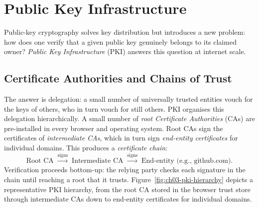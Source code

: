 \section{Public Key Infrastructure}
\label{sec:pki}

Public-key cryptography solves key distribution but introduces a new problem: how does one verify that a given public key genuinely belongs to its claimed owner?  \emph{Public Key Infrastructure} (PKI) answers this question at internet scale.

\subsection{Certificate Authorities and Chains of Trust}
\label{subsec:ca}

The answer is delegation: a small number of universally trusted entities vouch for the keys of others, who in turn vouch for still others.  PKI organises this delegation hierarchically.  A small number of \emph{root Certificate Authorities} (CAs) are pre-installed in every browser and operating system.  Root CAs sign the certificates of \emph{intermediate CAs}, which in turn sign \emph{end-entity certificates} for individual domains.  This produces a \emph{certificate chain}:
\[
\text{Root CA} \;\xrightarrow{\text{signs}}\; \text{Intermediate CA} \;\xrightarrow{\text{signs}}\; \text{End-entity (e.g., github.com)}.
\]
Verification proceeds bottom-up: the relying party checks each signature in the chain until reaching a root that it trusts.  Figure~\ref{fig:ch03-pki-hierarchy} depicts a representative PKI hierarchy, from the root CA stored in the browser trust store through intermediate CAs down to end-entity certificates for individual domains.

